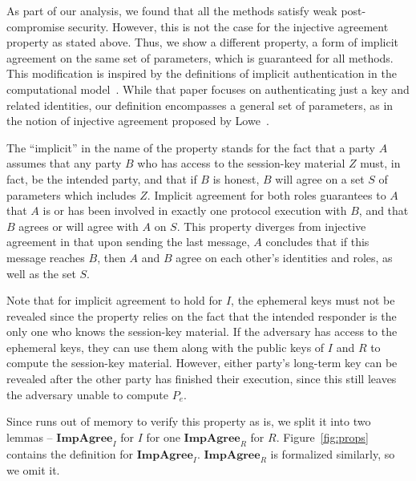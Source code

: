 \documentclass[runningheads]{llncs}
\newcommand{\mProtocolStyle}[1]{\text{#1}}
\newcommand{\mPredImpI}{\ensuremath{\mathbf{ImpAgree}_I}}
\newcommand{\mPredImpR}{\ensuremath{\mathbf{ImpAgree}_R}}
\newcommand{\mTamarin}{\mProtocolStyle{Tamarin}}
\newcommand{\mEdhoc}{\mProtocolStyle{EDHOC}}
\newcommand{\mGxy}{\ensuremath{P_e}}
\newcommand{\mSessKey}{\ensuremath{Z}}
\begin{document}
As part of our analysis, we found that all the \mEdhoc{} methods satisfy weak
post-compromise security.
%
However, this is not the case for the injective agreement property as stated 
above.
%
Thus, we show a different property, a form of implicit agreement on the same
set of parameters, which is guaranteed for all methods.
%
This modification is inspired by the definitions of implicit authentication in
the computational model~\cite{DBLP:conf/csfw/GuilhemFW20}.
%
While that paper focuses on authenticating just a key and related identities,
our definition encompasses a general set of parameters, as in the notion of
injective agreement proposed by Lowe~\cite{DBLP:conf/csfw/Lowe97a}.

The ``implicit'' in the name of the property stands for the fact that a party
$A$ assumes that any party $B$ who has access to the session-key material
\mSessKey{} must, in fact, be the intended party, and that if $B$ is honest,
$B$ will agree on a set $S$ of parameters which includes \mSessKey.
%
Implicit agreement for both roles guarantees to $A$ that $A$ is or has been
involved in exactly one protocol execution with $B$, and that $B$ agrees or
will agree with $A$ on $S$.
%
This property diverges from injective agreement in that upon sending
the last message, $A$ concludes that if this message reaches $B$, then $A$
and $B$ agree on each other's identities and roles, as well as the set $S$.
%

Note that for implicit agreement to hold for $I$, the ephemeral keys must not
be revealed since the property relies on the fact that the intended responder
is the only one who knows the session-key material.
%
If the adversary has access to the ephemeral keys, they can use them along 
with
the public keys of $I$ and $R$ to compute the session-key material.
%
However, either party's long-term key can be revealed after the other
party has finished their execution, since this still leaves the adversary
unable to compute \mGxy{}.
%

Since \mTamarin{} runs out of memory to verify this property as is,
we split it into two lemmas -- \mPredImpI{} for $I$ for one \mPredImpR{} for 
$R$.
%
Figure~\ref{fig:props} contains the definition for \mPredImpI{}.
%
\mPredImpR{} is formalized similarly, so we omit it.
%

\end{document}
